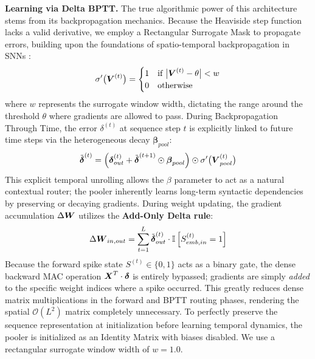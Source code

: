 \documentclass[11pt, conference, compsoc, twoside]{IEEEtran}
\begin{document}
\textbf{Learning via Delta BPTT.} The true algorithmic power of this architecture stems from its backpropagation mechanics. Because the Heaviside step function lacks a valid derivative, we employ a Rectangular Surrogate Mask to propagate errors, building upon the foundations of spatio-temporal backpropagation in SNNs \cite{neftci2019surrogate}:
\begin{equation}
\sigma'\big(\boldsymbol{V}^{(t)}\big) = \begin{cases} 1 & \text{if } \big|\boldsymbol{V}^{(t)} - \theta\big| < w \\ 0 & \text{otherwise} \end{cases}
\end{equation}
where $w$ represents the surrogate window width, dictating the range around the threshold $\theta$ where gradients are allowed to pass. During Backpropagation Through Time, the error $\delta^{(t)}$ at sequence step $t$ is explicitly linked to future time steps via the heterogeneous decay $\bm{\beta}_{pool}$:
\begin{equation}
\tilde{\boldsymbol{\delta}}^{(t)} = \left( \boldsymbol{\delta}_{out}^{(t)} + \tilde{\boldsymbol{\delta}}^{(t+1)} \odot \boldsymbol{\beta}_{pool} \right) \odot \sigma'\big(\boldsymbol{V}_{pool}^{(t)}\big)
\end{equation}
This explicit temporal unrolling allows the $\beta$ parameter to act as a natural contextual router; the pooler inherently learns long-term syntactic dependencies by preserving or decaying gradients. During weight updating, the gradient accumulation $\Delta \boldsymbol{W}$ utilizes the \textbf{Add-Only Delta rule}:
\begin{equation}
\Delta \boldsymbol{W}_{in, out} = \sum_{t=1}^{L} \tilde{\boldsymbol{\delta}}^{(t)}_{out} \cdot \mathbb{I}\left[ S_{emb, in}^{(t)} = 1 \right]
\end{equation}
Because the forward spike state $S^{(t)} \in \{0, 1\}$ acts as a binary gate, the dense backward MAC operation $\boldsymbol{X}^T \cdot \boldsymbol{\delta}$ is entirely bypassed; gradients are simply \textit{added} to the specific weight indices where a spike occurred. This greatly reduces dense matrix multiplications in the forward and BPTT routing phases, rendering the spatial $\mathcal{O}(L^2)$ matrix completely unnecessary. To perfectly preserve the sequence representation at initialization before learning temporal dynamics, the pooler is initialized as an Identity Matrix with biases disabled. We use a rectangular surrogate window width of $w=1.0$.
\end{document}
